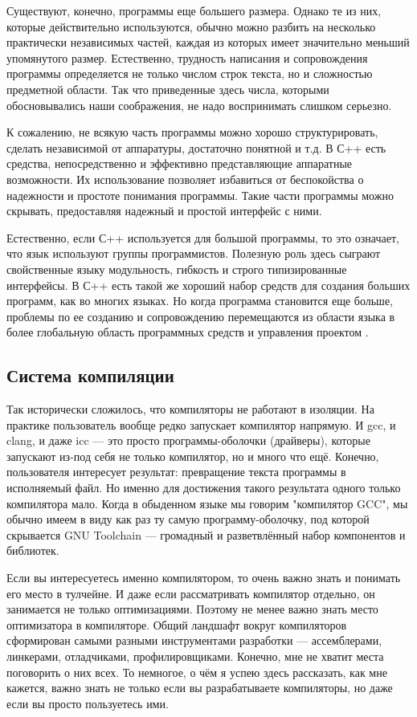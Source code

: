 Существуют, конечно, программы еще большего размера. Однако те из них, которые действительно используются, обычно можно разбить на несколько практически независимых частей, каждая из которых имеет значительно меньший упомянутого размер. Естественно, трудность написания и сопровождения программы определяется не только числом строк текста, но и сложностью предметной области. Так что приведенные здесь числа, которыми обосновывались наши соображения, не надо воспринимать слишком серьезно.

К сожалению, не всякую часть программы можно хорошо структурировать, сделать независимой от аппаратуры, достаточно понятной и т.д. В С++ есть средства, непосредственно и эффективно представляющие аппаратные возможности. Их использование позволяет избавиться от беспокойства о надежности и простоте понимания программы. Такие части программы можно скрывать, предоставляя надежный и простой интерфейс с ними.

Естественно, если С++ используется для большой программы, то это означает, что язык используют группы программистов. Полезную роль здесь сыграют свойственные языку модульность, гибкость и строго типизированные интерфейсы. В С++ есть такой же хороший набор средств для создания больших программ, как во многих языках. Но когда программа становится еще больше, проблемы по ее созданию и сопровождению перемещаются из области языка в более глобальную область программных средств и управления проектом \cite{StroustrupCpp}.


\subsection{Система компиляции}

Так исторически сложилось, что компиляторы не работают в изоляции. На практике пользователь вообще редко запускает компилятор напрямую. И gcc, и clang, и даже icc — это просто программы-оболочки (драйверы), которые запускают из-под себя не только компилятор, но и много что ещё. Конечно, пользователя интересует результат: превращение текста программы в исполняемый файл. Но именно для достижения такого результата одного только компилятора мало. Когда в обыденном языке мы говорим "компилятор GCC", мы обычно имеем в виду как раз ту самую программу-оболочку, под которой скрывается GNU Toolchain — громадный и разветвлённый набор компонентов и библиотек.

Если вы интересуетесь именно компилятором, то очень важно знать и понимать его место в тулчейне. И даже если рассматривать компилятор отдельно, он занимается не только оптимизациями. Поэтому не менее важно знать место оптимизатора в компиляторе.
Общий ландшафт вокруг компиляторов сформирован самыми разными инструментами разработки — ассемблерами, линкерами, отладчиками, профилировщиками. Конечно, мне не хватит места поговорить о них всех. То немногое, о чём я успею здесь рассказать, как мне кажется, важно знать не только если вы разрабатываете компиляторы, но даже если вы просто пользуетесь ими.

